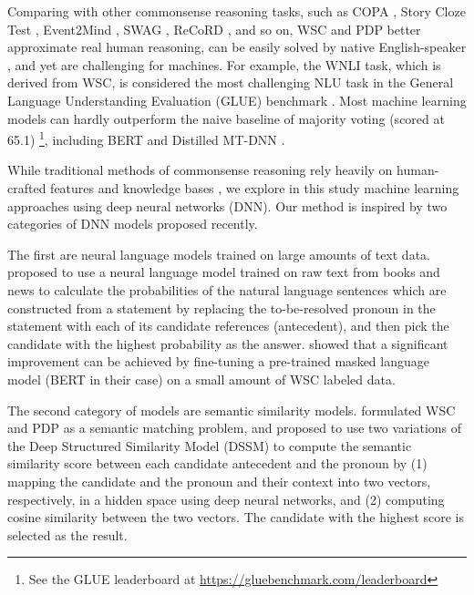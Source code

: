 \documentclass[11pt,a4paper]{article}
\begin{document}
Comparing with other commonsense reasoning tasks, such as 
COPA \cite{roemmele2011choice}, 
Story Cloze Test \cite{mostafazadeh-EtAl:2016:N16-1},
Event2Mind \cite{rashkin2018event2mind},
SWAG \cite{zellers2018swag}, 
ReCoRD \cite{zhang2018record}, and so on, 
WSC and PDP better approximate real human reasoning, can be easily solved by native English-speaker \cite{levesque2011winograd}, and yet are challenging for machines. For example, the WNLI task, which is derived from WSC, is considered the most challenging NLU task in the General Language Understanding Evaluation (GLUE) benchmark \cite{wang2018glue}. Most machine learning models can hardly outperform the naive baseline of majority voting (scored at 65.1) \footnote{See the GLUE leaderboard at \url{https://gluebenchmark.com/leaderboard}}, including BERT \cite{devlin2018bert} and Distilled MT-DNN \cite{liu2019mt-dnn-kd}.

While traditional methods of commonsense reasoning rely heavily on human-crafted features and knowledge bases \cite{D12-1071,Sharma:2015:TAW:2832415.2832433,KR147958,SSS1510295,liu2016combing}, we explore in this study machine learning approaches using deep neural networks (DNN). Our method is inspired by two categories of  DNN models proposed recently. 

The first are neural language models trained on large amounts of text data. \citet{trinh2018simple} proposed to use a neural language model trained on raw text from books and news to calculate the probabilities of the natural language sentences which are constructed from a statement by replacing the to-be-resolved pronoun in the statement with each of its candidate references (antecedent), and then pick the candidate with the highest probability as the answer. \citet{kocijan2019surprisingly} showed that a significant improvement can be achieved by fine-tuning a pre-trained masked language model (BERT in their case) on a small amount of WSC labeled data.

The second category of models are semantic similarity models. \citet{wang-etal-2019-unsupervised} formulated WSC and PDP as a semantic matching problem, and proposed to use two variations of the Deep Structured Similarity Model (DSSM) \cite{huang2013dssm} to compute the semantic similarity score between each candidate antecedent and the pronoun by (1) mapping the candidate and the pronoun and their context into two vectors, respectively, in a hidden space using deep neural networks, and (2) computing cosine similarity between the two vectors.  The candidate with the highest score is selected as the result.
\end{document}
